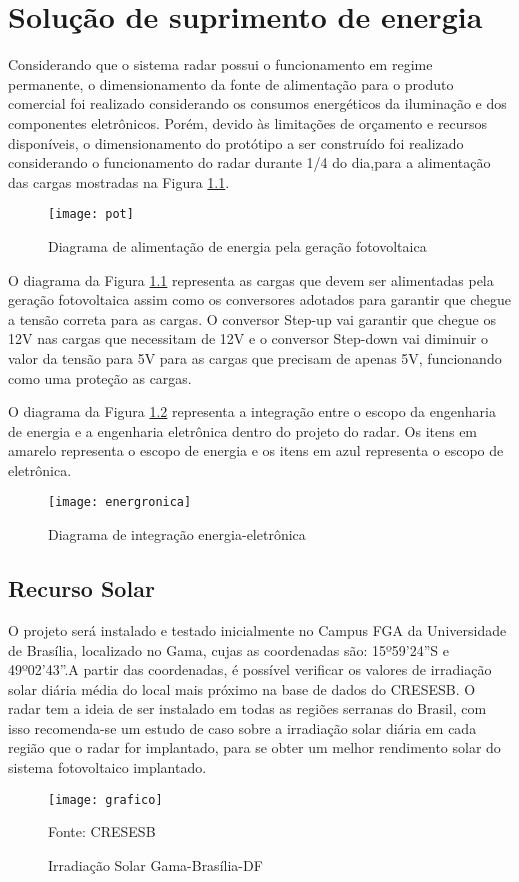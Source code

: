 

\chapter{Solução de suprimento de energia}
Considerando que o sistema radar possui o funcionamento em regime permanente, o dimensionamento da fonte de alimentação para o produto comercial foi realizado considerando os consumos energéticos da iluminação e dos componentes eletrônicos. Porém, devido às limitações de orçamento e recursos disponíveis, o dimensionamento do protótipo a ser construído foi realizado considerando o funcionamento do radar durante 1/4 do dia,para a alimentação das cargas mostradas na Figura \ref{fig:circ}.

\begin{figure}[h!]
\centering
\texttt{[image: pot]}
\caption{Diagrama de alimentação de energia pela geração fotovoltaica }
\label{fig:circ}
\end{figure}

O diagrama da Figura \ref{fig:circ} representa as cargas que devem ser alimentadas pela geração fotovoltaica assim como os conversores adotados para garantir que chegue a tensão correta para as cargas. O conversor Step-up vai garantir que chegue os 12V nas cargas que necessitam de 12V e o conversor Step-down vai diminuir o valor da tensão para 5V para as cargas que precisam de apenas 5V, funcionando como uma proteção as cargas.

O diagrama da Figura \ref{fig:circ1} representa a integração entre o escopo da engenharia de energia e a engenharia eletrônica dentro do projeto do radar. Os itens em amarelo representa o escopo de energia e os itens em azul representa o escopo de eletrônica.

\begin{figure}[h!]
\centering
\texttt{[image: energronica]}
\caption{Diagrama de integração energia-eletrônica }
\label{fig:circ1}
\end{figure}


\section{Recurso Solar}

O projeto será instalado e testado inicialmente no Campus FGA da Universidade de Brasília, localizado no Gama, cujas as coordenadas são: 15º59’24”S e 49º02’43”.A partir das coordenadas, é possível verificar os valores de irradiação solar diária média do local mais próximo na base de dados do CRESESB.
O radar tem a ideia de ser instalado em todas as regiões serranas do Brasil, com isso recomenda-se um estudo de caso sobre a irradiação solar diária em cada região que o radar for implantado, para se obter um melhor rendimento solar do sistema fotovoltaico implantado. 
\begin{figure}[h!]
\centering
\texttt{[image: grafico]}
\caption{Irradiação Solar Gama-Brasília-DF}
Fonte: CRESESB
\label{fig:grafico}
\end{figure}

